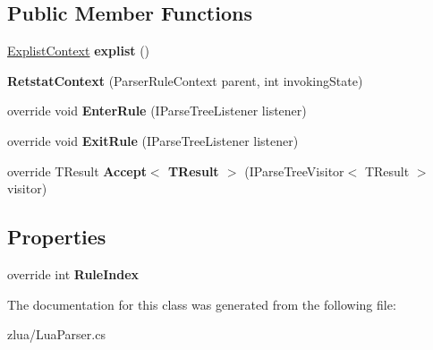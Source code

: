 \subsection*{Public Member Functions}
\begin{DoxyCompactItemize}
\item 
\mbox{\label{classzlua_1_1_lua_parser_1_1_retstat_context_aa7a5138cdb03322c482efe6f826fb26f}} 
\mbox{\hyperlink{classzlua_1_1_lua_parser_1_1_explist_context}{Explist\+Context}} {\bfseries explist} ()
\item 
\mbox{\label{classzlua_1_1_lua_parser_1_1_retstat_context_a64dba0da4aae8aa478fa6a3a45cd5cce}} 
{\bfseries Retstat\+Context} (Parser\+Rule\+Context parent, int invoking\+State)
\item 
\mbox{\label{classzlua_1_1_lua_parser_1_1_retstat_context_a5dfa749729a0f94a1dddefdb786db918}} 
override void {\bfseries Enter\+Rule} (I\+Parse\+Tree\+Listener listener)
\item 
\mbox{\label{classzlua_1_1_lua_parser_1_1_retstat_context_a32e1151d9dc80fec51bf0728ed06d187}} 
override void {\bfseries Exit\+Rule} (I\+Parse\+Tree\+Listener listener)
\item 
\mbox{\label{classzlua_1_1_lua_parser_1_1_retstat_context_a573d30d155173094a8995edd08716ffd}} 
override T\+Result {\bfseries Accept$<$ T\+Result $>$} (I\+Parse\+Tree\+Visitor$<$ T\+Result $>$ visitor)
\end{DoxyCompactItemize}
\subsection*{Properties}
\begin{DoxyCompactItemize}
\item 
\mbox{\label{classzlua_1_1_lua_parser_1_1_retstat_context_aa474b4788120b68f0cfeaa7c6890b071}} 
override int {\bfseries Rule\+Index}
\end{DoxyCompactItemize}


The documentation for this class was generated from the following file\+:\begin{DoxyCompactItemize}
\item 
zlua/Lua\+Parser.\+cs\end{DoxyCompactItemize}
